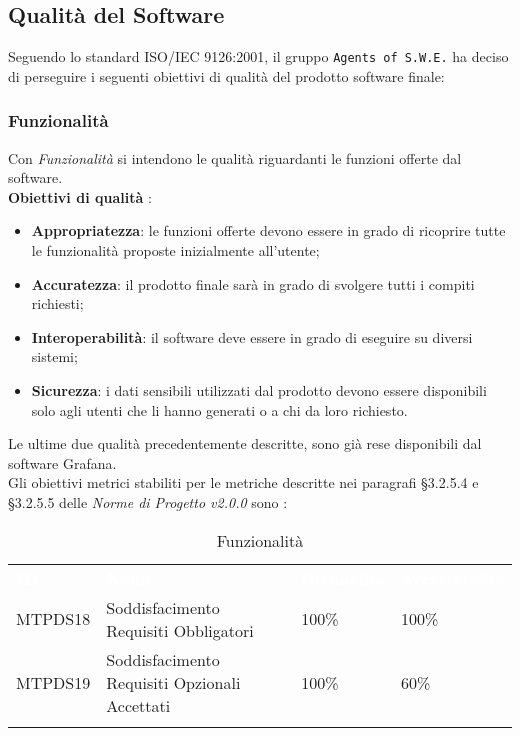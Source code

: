 \subsection{Qualità del Software}

Seguendo lo standard ISO/IEC 9126:2001, il gruppo \texttt{Agents of S.W.E.} ha deciso di perseguire i seguenti obiettivi di qualità del prodotto software finale:


\subsubsection{Funzionalità}

Con \textit{Funzionalità} si intendono le qualità riguardanti le funzioni offerte dal software.\\
\textbf{Obiettivi di qualità} :
\begin{itemize}
	\item \textbf{Appropriatezza}: le funzioni offerte devono essere in grado di ricoprire tutte le funzionalità proposte inizialmente all'utente;
	\item \textbf{Accuratezza}: il prodotto finale sarà in grado di svolgere tutti i compiti richiesti;
	\item \textbf{Interoperabilità}: il software deve essere in grado di eseguire su diversi sistemi;
	\item \textbf{Sicurezza}: i dati sensibili utilizzati dal prodotto devono essere disponibili solo agli utenti che li hanno generati o a chi da loro richiesto. 
\end{itemize}
Le ultime due qualità precedentemente descritte, sono già rese disponibili dal software Grafana. \\

Gli obiettivi metrici stabiliti per le metriche descritte nei paragrafi §3.2.5.4 e §3.2.5.5 delle \textit{Norme di Progetto v2.0.0} sono : 

\begin{longtable}{|C{.15\textwidth}|C{.24\textwidth}|C{.24\textwidth}|C{.24\textwidth}|}
\hline
{}\textbf{\textcolor{white}{ID}} & \textbf{\textcolor{white}{Nome}} & \textbf{\textcolor{white}{Ottimalità}} & \textbf{\textcolor{white}{Accettabilità}}\\
MTPDS18 & Soddisfacimento Requisiti Obbligatori & 100\% & 100\%\\
\hline
{}MTPDS19 & Soddisfacimento Requisiti Opzionali Accettati & 100\% & 60\% \\ 
\hline
\caption{Funzionalità}
\label{Funzionalità}
\end{longtable}

